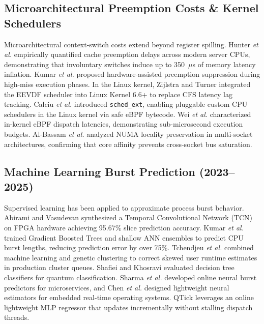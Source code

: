 \documentclass[journal]{IEEEtran}
\begin{document}
\subsection{Microarchitectural Preemption Costs \& Kernel Schedulers}
Microarchitectural context-switch costs extend beyond register spilling. Hunter \textit{et al.} \cite{hunter2024quantifying} empirically quantified cache preemption delays across modern server CPUs, demonstrating that involuntary switches induce up to 350~$\mu$s of memory latency inflation. Kumar \textit{et al.} \cite{kumar2023hardware} proposed hardware-assisted preemption suppression during high-miss execution phases. In the Linux kernel, Zijlstra and Turner \cite{zijlstra2023eevdf} integrated the EEVDF scheduler into Linux Kernel 6.6+ to replace CFS latency lag tracking. Calciu \textit{et al.} \cite{calciu2023schedext} introduced \texttt{sched\_ext}, enabling pluggable custom CPU schedulers in the Linux kernel via safe eBPF bytecode. Wei \textit{et al.} \cite{wei2024kernel} characterized in-kernel eBPF dispatch latencies, demonstrating sub-microsecond execution budgets. Al-Bassam \textit{et al.} \cite{albassam2023numa} analyzed NUMA locality preservation in multi-socket architectures, confirming that core affinity prevents cross-socket bus saturation.

\subsection{Machine Learning Burst Prediction (2023--2025)}
Supervised learning has been applied to approximate process burst behavior. Abirami and Vasudevan \cite{abirami2025temporal} synthesized a Temporal Convolutional Network (TCN) on FPGA hardware achieving 95.67\% slice prediction accuracy. Kumar \textit{et al.} \cite{kumar2025predicting} trained Gradient Boosted Trees and shallow ANN ensembles to predict CPU burst lengths, reducing prediction error by over 75\%. Tchendjeu \textit{et al.} \cite{tchendjeu2024combining} combined machine learning and genetic clustering to correct skewed user runtime estimates in production cluster queues. Shafiei and Khosravi \cite{shafiei2023determining} evaluated decision tree classifiers for quantum classification. Sharma \textit{et al.} \cite{sharma2024online} developed online neural burst predictors for microservices, and Chen \textit{et al.} \cite{chen2023lightweight} designed lightweight neural estimators for embedded real-time operating systems. QTick leverages an online lightweight MLP regressor that updates incrementally without stalling dispatch threads.
\end{document}
